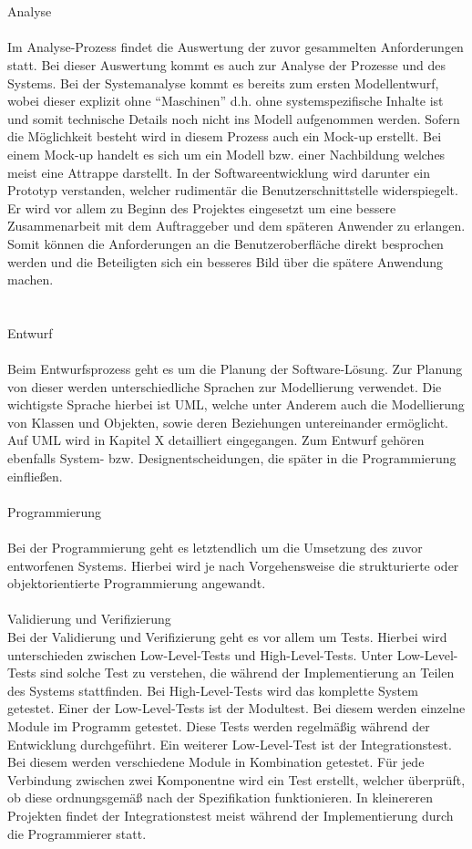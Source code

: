 \\
\\
Analyse\\
\\
Im Analyse-Prozess findet die Auswertung der zuvor gesammelten Anforderungen statt. Bei dieser Auswertung kommt es auch zur Analyse der Prozesse und des Systems. Bei der Systemanalyse kommt es bereits zum ersten Modellentwurf, wobei dieser explizit ohne “Maschinen” d.h. ohne systemspezifische Inhalte ist und somit technische Details noch nicht ins Modell aufgenommen werden. Sofern die Möglichkeit besteht wird in diesem Prozess auch ein Mock-up erstellt. Bei einem Mock-up handelt es sich um ein Modell bzw. einer Nachbildung welches meist eine Attrappe darstellt. In der Softwareentwicklung wird darunter ein Prototyp verstanden, welcher rudimentär die Benutzerschnittstelle widerspiegelt. Er wird vor allem zu Beginn des Projektes eingesetzt um eine bessere Zusammenarbeit mit dem Auftraggeber und dem späteren Anwender zu erlangen. Somit können die Anforderungen an die Benutzeroberfläche direkt besprochen werden und die Beteiligten sich ein besseres Bild über die spätere Anwendung machen.\\
\\
\\
Entwurf\\
\\
Beim Entwurfsprozess geht es um die Planung der Software-Lösung. Zur Planung von dieser werden unterschiedliche Sprachen zur Modellierung verwendet. Die wichtigste Sprache hierbei ist UML, welche unter Anderem auch die Modellierung von Klassen und Objekten, sowie deren Beziehungen untereinander ermöglicht. Auf UML wird in Kapitel X detailliert eingegangen.
Zum Entwurf gehören ebenfalls System- bzw. Designentscheidungen, die später in die Programmierung einfließen.
\\
\\
Programmierung\\
\\
Bei der Programmierung geht es letztendlich um die Umsetzung des zuvor entworfenen Systems. Hierbei wird je nach Vorgehensweise die strukturierte oder objektorientierte Programmierung angewandt.
\\
\\
Validierung und Verifizierung
\\
Bei der Validierung  und Verifizierung geht es vor allem um Tests. Hierbei wird unterschieden zwischen Low-Level-Tests und High-Level-Tests. Unter Low-Level-Tests sind solche Test zu verstehen, die während der Implementierung an Teilen des Systems stattfinden. Bei High-Level-Tests wird das komplette System getestet. Einer der Low-Level-Tests ist der Modultest. Bei diesem werden einzelne Module im Programm getestet.  Diese Tests werden regelmäßig während der Entwicklung durchgeführt. Ein weiterer Low-Level-Test ist der Integrationstest. Bei diesem werden verschiedene Module in Kombination getestet. Für jede Verbindung zwischen zwei Komponentne wird ein Test erstellt, welcher überprüft, ob diese ordnungsgemäß nach der Spezifikation funktionieren. In kleinereren Projekten findet der Integrationstest meist während der Implementierung durch die Programmierer statt.
